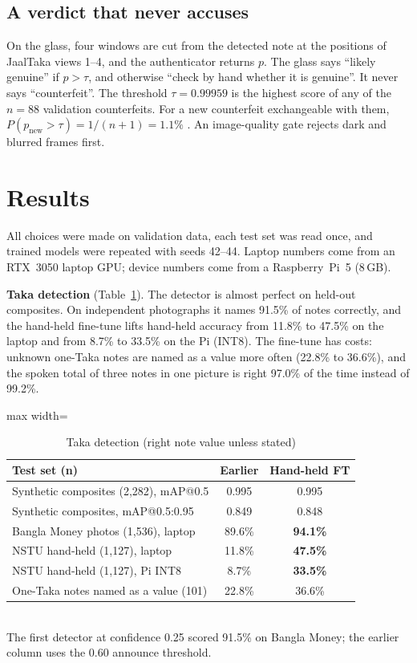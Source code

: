 \documentclass[conference]{IEEEtran}
\begin{document}
\subsection{A verdict that never accuses}
On the glass, four windows are cut from the detected note at the positions of JaalTaka views 1--4, and the authenticator returns $p$. The glass says ``likely genuine'' if $p>\tau$, and otherwise ``check by hand whether it is genuine''. It never says ``counterfeit''. The threshold $\tau=0.99959$ is the highest score of any of the $n=88$ validation counterfeits. For a new counterfeit exchangeable with them, $P(p_{\text{new}}>\tau)=1/(n+1)=1.1\%$ \cite{vovk2005}. An image-quality gate rejects dark and blurred frames first.

\section{Results}
All choices were made on validation data, each test set was read once, and trained models were repeated with seeds 42--44. Laptop numbers come from an RTX~3050 laptop GPU; device numbers come from a Raspberry~Pi~5 (8\,GB).

\textbf{Taka detection} (Table~\ref{tab:det}). The detector is almost perfect on held-out composites. On independent photographs it names 91.5\% of notes correctly, and the hand-held fine-tune lifts hand-held accuracy from 11.8\% to 47.5\% on the laptop and from 8.7\% to 33.5\% on the Pi (INT8). The fine-tune has costs: unknown one-Taka notes are named as a value more often (22.8\% to 36.6\%), and the spoken total of three notes in one picture is right 97.0\% of the time instead of 99.2\%.

\begin{table}[t]
\caption{Taka detection (right note value unless stated)}
\label{tab:det}
\centering\small
\begin{adjustbox}{max width=\columnwidth}\begin{tabular}{@{}lcc@{}}
\toprule
Test set (n) & Earlier & Hand-held FT \\ \midrule
Synthetic composites (2,282), mAP@0.5 & 0.995 & 0.995 \\
Synthetic composites, mAP@0.5:0.95 & 0.849 & 0.848 \\
Bangla Money photos (1,536), laptop & 89.6\% & \textbf{94.1\%} \\
NSTU hand-held (1,127), laptop & 11.8\% & \textbf{47.5\%} \\
NSTU hand-held (1,127), Pi INT8 & 8.7\% & \textbf{33.5\%} \\
One-Taka notes named as a value (101) & 22.8\% & 36.6\% \\ \bottomrule
\end{tabular}\end{adjustbox}\\[2pt]
{\footnotesize The first detector at confidence 0.25 scored 91.5\% on Bangla Money; the earlier column uses the 0.60 announce threshold.}
\end{table}
\end{document}
